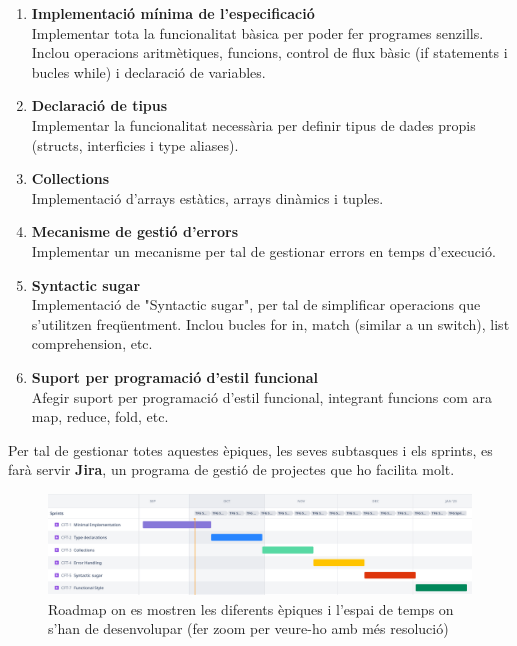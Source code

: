 ﻿\documentclass{article}
\begin{document}
\begin{enumerate}
    \item \textbf{Implementació mínima de l'especificació}\\
        Implementar tota la funcionalitat bàsica per poder fer programes senzills.
        Inclou operacions aritmètiques, funcions, control de flux bàsic (if
        statements i bucles while) i declaració de variables.

    \item \textbf{Declaració de tipus} \\
        Implementar la funcionalitat necessària per definir tipus de dades
        propis (structs, interficies i type aliases).

    \item \textbf{Collections}\\
        Implementació d'arrays estàtics, arrays dinàmics i tuples.

    \item \textbf{Mecanisme de gestió d'errors}\\
        Implementar un mecanisme per tal de gestionar errors en temps d'execució.

    \item \textbf{Syntactic sugar}\\
        Implementació de "Syntactic sugar", per tal de simplificar operacions
        que s'utilitzen freqüentment. Inclou bucles for in, match (similar a un
        switch), list comprehension, etc.

    \item \textbf{Suport per programació d'estil funcional}\\
        Afegir suport per programació d'estil funcional, integrant funcions com
        ara map, reduce, fold, etc.
\end{enumerate}

Per tal de gestionar totes aquestes èpiques, les seves subtasques i els sprints,
es farà servir \textbf{Jira}, un programa de gestió de projectes que ho facilita molt.

\begin{figure}
    \includegraphics[width=\linewidth]{roadmap}
    \centering
    \captionsetup{justification=centering}
    \caption{Roadmap on es mostren les diferents èpiques i l'espai de temps on s'han de desenvolupar (fer zoom per veure-ho amb més resolució)}
\end{figure}
\end{document}
